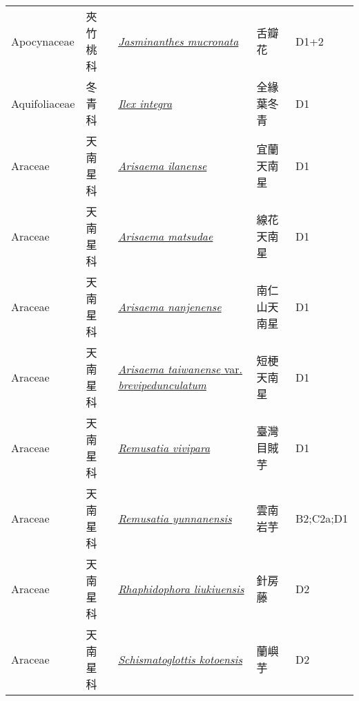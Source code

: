 {\begin{longtable}{p{2.5cm}p{2.5cm}p{4.5cm}p{2.5cm}p{3cm}}
    Apocynaceae & 夾竹桃科 & \href{http://www.theplantlist.org/tpl1.1/search?q=Jasminanthes+mucronata}{\textit{Jasminanthes mucronata} } & 舌瓣花 & D1+2 \index{Jasminanthes@\textit{Jasminanthes}!mucronata@\textit{mucronata}}  \index{舌瓣花} \\
    Aquifoliaceae & 冬青科 & \href{http://www.theplantlist.org/tpl1.1/search?q=Ilex+integra}{\textit{Ilex integra} } & 全緣葉冬青 & D1 \index{Ilex@\textit{Ilex}!integra@\textit{integra}}  \index{全緣葉冬青} \\
    Araceae & 天南星科 & \href{http://www.theplantlist.org/tpl1.1/search?q=Arisaema+ilanense}{\textit{Arisaema ilanense} } & 宜蘭天南星 & D1 \index{Arisaema@\textit{Arisaema}!ilanense@\textit{ilanense}}  \index{宜蘭天南星} \\
    Araceae & 天南星科 & \href{http://www.theplantlist.org/tpl1.1/search?q=Arisaema+matsudae}{\textit{Arisaema matsudae} } & 線花天南星 & D1 \index{Arisaema@\textit{Arisaema}!matsudae@\textit{matsudae}}  \index{線花天南星} \\
    Araceae & 天南星科 & \href{http://www.theplantlist.org/tpl1.1/search?q=Arisaema+nanjenense}{\textit{Arisaema nanjenense} } & 南仁山天南星 & D1 \index{Arisaema@\textit{Arisaema}!nanjenense@\textit{nanjenense}}  \index{南仁山天南星} \\
    Araceae & 天南星科 & \href{http://www.theplantlist.org/tpl1.1/search?q=Arisaema+taiwanense+var.+brevipedunculatum}{\textit{Arisaema taiwanense} var. \textit{brevipedunculatum} } & 短梗天南星 & D1 \index{Arisaema@\textit{Arisaema}!taiwanense@\textit{taiwanense}!var. brevipedunculatum@var. \textit{brevipedunculatum}}  \index{短梗天南星} \\
    Araceae & 天南星科 & \href{http://www.theplantlist.org/tpl1.1/search?q=Remusatia+vivipara}{\textit{Remusatia vivipara} } & 臺灣目賊芋 & D1 \index{Remusatia@\textit{Remusatia}!vivipara@\textit{vivipara}}  \index{臺灣目賊芋} \\
    Araceae & 天南星科 & \href{http://www.theplantlist.org/tpl1.1/search?q=Remusatia+yunnanensis}{\textit{Remusatia yunnanensis} } & 雲南岩芋 & B2;C2a;D1 \index{Remusatia@\textit{Remusatia}!yunnanensis@\textit{yunnanensis}}  \index{雲南岩芋} \\
    Araceae & 天南星科 & \href{http://www.theplantlist.org/tpl1.1/search?q=Rhaphidophora+liukiuensis}{\textit{Rhaphidophora liukiuensis} } & 針房藤 & D2 \index{Rhaphidophora@\textit{Rhaphidophora}!liukiuensis@\textit{liukiuensis}}  \index{針房藤} \\
    Araceae & 天南星科 & \href{http://www.theplantlist.org/tpl1.1/search?q=Schismatoglottis+kotoensis}{\textit{Schismatoglottis kotoensis} } & 蘭嶼芋 & D2 \index{Schismatoglottis@\textit{Schismatoglottis}!kotoensis@\textit{kotoensis}}  \index{蘭嶼芋} \\

\end{longtable}}
